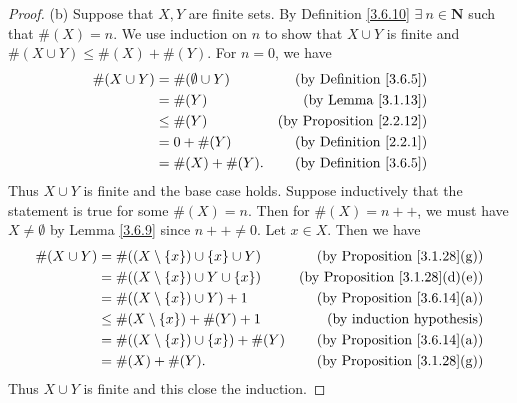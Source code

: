 \begin{proof}{(b)}
Suppose that \(X, Y\) are finite sets.
By Definition \ref{3.6.10} \(\exists\ n \in \mathbf{N}\) such that \(\#(X) = n\).
We use induction on \(n\) to show that \(X \cup Y\) is finite and \(\#(X \cup Y) \leq \#(X) + \#(Y)\).
For \(n = 0\), we have
\begin{align*}
\#(X \cup Y) &= \#(\emptyset \cup Y) & \text{(by Definition \ref{3.6.5})} \\
&= \#(Y) & \text{(by Lemma \ref{3.1.13})} \\
&\leq \#(Y) & \text{(by Proposition \ref{2.2.12})} \\
&= 0 + \#(Y) & \text{(by Definition \ref{2.2.1})} \\
&= \#(X) + \#(Y). & \text{(by Definition \ref{3.6.5})}
\end{align*}
Thus \(X \cup Y\) is finite and the base case holds.
Suppose inductively that the statement is true for some \(\#(X) = n\).
Then for \(\#(X) = n++\), we must have \(X \neq \emptyset\) by Lemma \ref{3.6.9} since \(n++ \neq 0\).
Let \(x \in X\).
Then we have
\begin{align*}
\#(X \cup Y) &= \#((X \setminus \{x\}) \cup \{x\} \cup Y) & \text{(by Proposition \ref{3.1.28}(g))} \\
&= \#((X \setminus \{x\}) \cup Y \cup \{x\}) & \text{(by Proposition \ref{3.1.28}(d)(e))} \\
&= \#((X \setminus \{x\}) \cup Y) + 1 & \text{(by Proposition \ref{3.6.14}(a))} \\
&\leq \#(X \setminus \{x\}) + \#(Y) + 1 & \text{(by induction hypothesis)} \\
&= \#((X \setminus \{x\}) \cup \{x\}) + \#(Y) & \text{(by Proposition \ref{3.6.14}(a))} \\
&= \#(X) + \#(Y). & \text{(by Proposition \ref{3.1.28}(g))}
\end{align*}
Thus \(X \cup Y\) is finite and this close the induction.


\end{proof}
